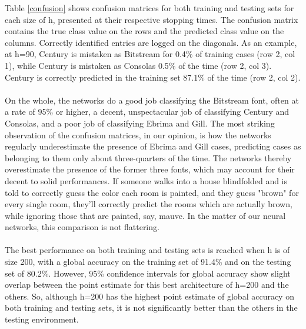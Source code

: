 \documentclass{homework}
\begin{document}
Table \ref{confusion} shows confusion matrices for both training and testing sets for each size of h, presented at their respective stopping times. The confusion matrix contains the true class value on the rows and the predicted class value on the columns. Correctly identified entries are logged on the diagonals. As an example, at h=90, Century is mistaken as Bitstream for 0.4\% of training cases (row 2, col 1), while Century is mistaken as Consolas 0.5\% of the time (row 2, col 3). Century is correctly predicted in the training set 87.1\% of the time (row 2, col 2).\\\\
On the whole, the networks do a good job classifying the Bitstream font, often at a rate of 95\% or higher, a decent, unspectacular job of classifying Century and Consolas, and a poor job of classifying Ebrima and Gill. The most striking observation of the confusion matrices, in our opinion, is how the networks regularly underestimate the presence of Ebrima and Gill cases, predicting cases as belonging to them only about three-quarters of the time. The networks thereby overestimate the presence of the former three fonts, which may account for their decent to solid performances. If someone walks into a house blindfolded and is told to correctly guess the color each room is painted, and they guess "brown" for every single room, they'll correctly predict the rooms which are actually brown, while ignoring those that are painted, say, mauve. In the matter of our neural networks, this comparison is not flattering. \\\\
The best performance on both training and testing sets is reached when h is of size 200, with a global accuracy on the training set of 91.4\% and on the testing set of 80.2\%. However, 95\% confidence intervals for global accuracy show slight overlap between the point estimate for this best architecture of h=200 and the others. So, although h=200 has the highest point estimate of global accuracy on both training and testing sets, it is not significantly better than the others in the testing environment. 
\end{document}
